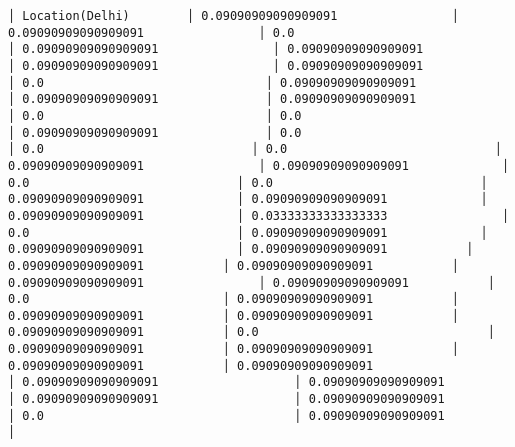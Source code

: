 \documentclass[11pt]{article}
\begin{document}
\begin{Verbatim}[commandchars=\\\{\}]
│ Location(Delhi)        │ 0.09090909090909091                │ 0.09090909090909091                │ 0.0                                │ 0.09090909090909091                │ 0.09090909090909091                │ 0.09090909090909091                │ 0.09090909090909091                │ 0.0                               │ 0.09090909090909091               │ 0.09090909090909091               │ 0.09090909090909091                │ 0.0                               │ 0.0                               │ 0.09090909090909091               │ 0.0                             │ 0.0                             │ 0.0                             │ 0.09090909090909091                │ 0.09090909090909091             │ 0.0                             │ 0.0                             │ 0.09090909090909091             │ 0.09090909090909091             │ 0.09090909090909091             │ 0.03333333333333333                │ 0.0                             │ 0.09090909090909091             │ 0.09090909090909091             │ 0.09090909090909091           │ 0.09090909090909091           │ 0.09090909090909091           │ 0.09090909090909091                │ 0.09090909090909091           │ 0.0                           │ 0.09090909090909091           │ 0.09090909090909091           │ 0.09090909090909091           │ 0.09090909090909091           │ 0.0                                │ 0.09090909090909091           │ 0.09090909090909091           │ 0.09090909090909091           │ 0.09090909090909091                   │ 0.09090909090909091                   │ 0.09090909090909091                   │ 0.09090909090909091                   │ 0.09090909090909091                   │ 0.0                                   │ 0.09090909090909091                   │

\end{Verbatim}
\end{document}
